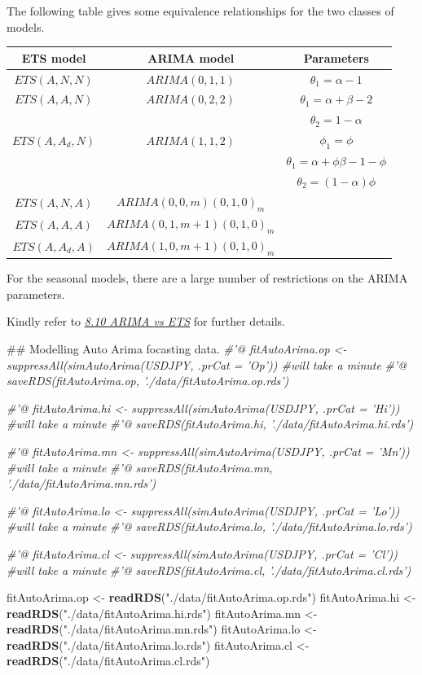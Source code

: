 \documentclass[]{tufte-book}
\newenvironment{Shaded}{}{}
\newcommand{\KeywordTok}[1]{\textcolor[rgb]{0.00,0.44,0.13}{\textbf{#1}}}
\newcommand{\StringTok}[1]{\textcolor[rgb]{0.25,0.44,0.63}{#1}}
\newcommand{\CommentTok}[1]{\textcolor[rgb]{0.38,0.63,0.69}{\textit{#1}}}
\newcommand{\NormalTok}[1]{#1}
\begin{document}
The following table gives some equivalence relationships for the two
classes of models.

\begin{longtable}[]{@{}ccc@{}}
\toprule
ETS model & ARIMA model & Parameters\tabularnewline
\midrule
\endhead
\(ETS(A, N, N)\) & \(ARIMA(0, 1, 1)\) & \(θ_{1} = α − 1\)\tabularnewline
\(ETS(A, A, N)\) & \(ARIMA(0, 2, 2)\) &
\(θ_{1} = α + β − 2\)\tabularnewline
& & \(θ_{2} = 1 − α\)\tabularnewline
\(ETS(A, A_{d}, N)\) & \(ARIMA(1, 1, 2)\) & \(ϕ_{1} = ϕ\)\tabularnewline
& & \(θ_{1} = α + ϕβ − 1 − ϕ\)\tabularnewline
& & \(θ_{2} = (1 − α)ϕ\)\tabularnewline
\(ETS(A, N, A)\) & \(ARIMA(0, 0, m)(0, 1, 0)_{m}\) &\tabularnewline
\(ETS(A, A, A)\) & \(ARIMA(0, 1, m+1)(0, 1, 0)_{m}\) &\tabularnewline
\(ETS(A, A_{d}, A)\) & \(ARIMA(1, 0, m+1)(0, 1, 0)_{m}\)
&\tabularnewline
\bottomrule
\end{longtable}

For the seasonal models, there are a large number of restrictions on the
ARIMA parameters.

Kindly refer to \href{https://www.otexts.org/fpp/8/10}{{\emph{8.10 ARIMA
vs ETS}}} for further details.

\begin{Shaded}
\begin{Highlighting}[]
\NormalTok{## Modelling Auto Arima focasting data.}
\CommentTok{#'@ fitAutoArima.op <- suppressAll(simAutoArima(USDJPY, .prCat = 'Op')) #will take a minute}
\CommentTok{#'@ saveRDS(fitAutoArima.op, './data/fitAutoArima.op.rds')}

\CommentTok{#'@ fitAutoArima.hi <- suppressAll(simAutoArima(USDJPY, .prCat = 'Hi')) #will take a minute}
\CommentTok{#'@ saveRDS(fitAutoArima.hi, './data/fitAutoArima.hi.rds')}

\CommentTok{#'@ fitAutoArima.mn <- suppressAll(simAutoArima(USDJPY, .prCat = 'Mn')) #will take a minute}
\CommentTok{#'@ saveRDS(fitAutoArima.mn, './data/fitAutoArima.mn.rds')}

\CommentTok{#'@ fitAutoArima.lo <- suppressAll(simAutoArima(USDJPY, .prCat = 'Lo')) #will take a minute}
\CommentTok{#'@ saveRDS(fitAutoArima.lo, './data/fitAutoArima.lo.rds')}

\CommentTok{#'@ fitAutoArima.cl <- suppressAll(simAutoArima(USDJPY, .prCat = 'Cl')) #will take a minute}
\CommentTok{#'@ saveRDS(fitAutoArima.cl, './data/fitAutoArima.cl.rds')}

\NormalTok{fitAutoArima.op <-}\StringTok{ }\KeywordTok{readRDS}\NormalTok{(}\StringTok{"./data/fitAutoArima.op.rds"}\NormalTok{)}
\NormalTok{fitAutoArima.hi <-}\StringTok{ }\KeywordTok{readRDS}\NormalTok{(}\StringTok{"./data/fitAutoArima.hi.rds"}\NormalTok{)}
\NormalTok{fitAutoArima.mn <-}\StringTok{ }\KeywordTok{readRDS}\NormalTok{(}\StringTok{"./data/fitAutoArima.mn.rds"}\NormalTok{)}
\NormalTok{fitAutoArima.lo <-}\StringTok{ }\KeywordTok{readRDS}\NormalTok{(}\StringTok{"./data/fitAutoArima.lo.rds"}\NormalTok{)}
\NormalTok{fitAutoArima.cl <-}\StringTok{ }\KeywordTok{readRDS}\NormalTok{(}\StringTok{"./data/fitAutoArima.cl.rds"}\NormalTok{)}
\end{Highlighting}
\end{Shaded}
\end{document}
